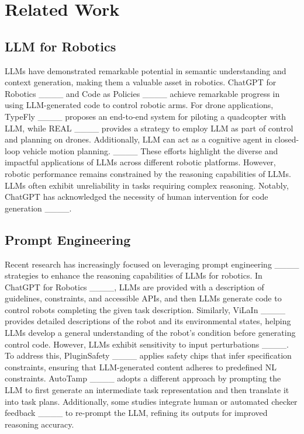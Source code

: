 \section{Related Work}
\label{RelatedWork}

\subsection{LLM for Robotics}
LLMs have demonstrated remarkable potential in semantic understanding and context generation, making them a valuable asset in robotics. ChatGPT for Robotics ____ and Code as Policies ____ achieve remarkable progress in using LLM-generated code to control robotic arms. For drone applications, TypeFly ____ proposes an end-to-end system for piloting a quadcopter with LLM, while REAL ____ provides a strategy to employ LLM as part of control and planning on drones. Additionally, LLM can act as a cognitive agent in closed-loop vehicle motion planning. ____ These efforts highlight the diverse and impactful applications of LLMs across different robotic platforms. However, robotic performance remains constrained by the reasoning capabilities of LLMs. LLMs often exhibit unreliability in tasks requiring complex reasoning.  Notably, ChatGPT has acknowledged the necessity of human intervention for code generation ____. %

\subsection{Prompt Engineering}
Recent research has increasingly focused on leveraging prompt engineering ____ strategies to enhance the reasoning capabilities of LLMs for robotics. In ChatGPT for Robotics ____, LLMs are provided with a description of guidelines, constraints, and accessible APIs, and then LLMs generate code to control robots completing the given task description. Similarly, ViLaIn ____ provides detailed descriptions of the robot and its environmental states, helping LLMs develop a general understanding of the robot's condition before generating control code. However, LLMs exhibit sensitivity to input perturbations ____. To address this, PluginSafety ____ applies safety chips that infer specification constraints, ensuring that LLM-generated content adheres to predefined NL constraints. AutoTamp ____ adopts a different approach by prompting the LLM to first generate an intermediate task representation and then translate it into task plans. Additionally, some studies integrate human or automated checker feedback ____ to re-prompt the LLM, refining its outputs for improved reasoning accuracy.

